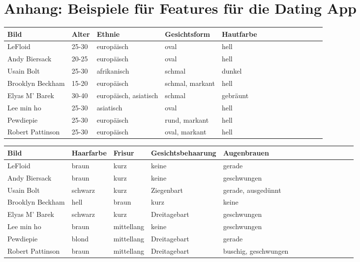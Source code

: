 \documentclass{newlayout}
\begin{document}
\nocite{*}



\onecolumn
\section*{Anhang: Beispiele für Features für die Dating App}
\small
\begin{tabular}{ | l | l | l | l | l | l | l | l | l | l | l | l | l | l | }
\hline
	Bild & Alter & Ethnie & Gesichtsform & Hautfarbe \\ \hline
	LeFloid & 25-30 & europäisch & oval & hell  \\ \hline
	Andy Biersack & 20-25 & europäisch & oval & hell  \\ \hline
	Usain Bolt & 25-30 & afrikanisch & schmal & dunkel   \\ \hline
	Brooklyn Beckham & 15-20 & europäisch & schmal, markant & hell  \\ \hline
	Elyas M' Barek & 30-40 & europäisch, asiatisch & schmal & gebräunt   \\ \hline
	Lee min ho & 25-30 & asiatisch & oval & hell \\ \hline
	Pewdiepie & 25-30 & europäisch & rund, markant & hell   \\ \hline
	Robert Pattinson & 25-30 & europäisch & oval, markant & hell  \\ \hline
\end{tabular}
\medskip
\vspace{1em}
\medskip
\begin{tabular}{ | l | l | l | l | l | l | l | l | l | l | l | l | l | l | }
\hline
	Bild & Haarfarbe & Frisur & Gesichtsbehaarung & Augenbrauen \\ \hline
	LeFloid & braun & kurz & keine & gerade \\ \hline
	Andy Biersack & braun & kurz & keine & geschwungen  \\ \hline
	Usain Bolt & schwarz & kurz & Ziegenbart & gerade, ausgedünnt  \\ \hline
	Brooklyn Beckham & hell & braun & kurz & keine \\ \hline
	Elyas M' Barek & schwarz & kurz & Dreitagebart & geschwungen  \\ \hline
	Lee min ho & braun & mittellang & keine & geschwungen  \\ \hline
	Pewdiepie & blond & mittellang & Dreitagebart & gerade  \\ \hline
	Robert Pattinson & braun & mittellang & Dreitagebart & buschig, geschwungen  \\ \hline
\end{tabular}
\end{document}
